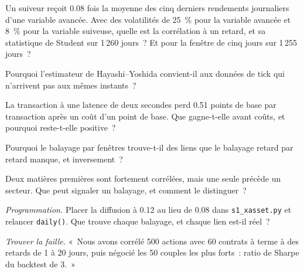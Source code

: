 \begin{exercise}[$\star$]\label{exo:s1:cross-asset-lead-lag:2}
Un suiveur reçoit 0.08 fois la moyenne des cinq derniers rendements journaliers d'une variable avancée. Avec des volatilités de 25~\% pour la variable avancée et 8~\% pour la variable suiveuse, quelle
est la corrélation à un retard, et sa statistique de Student sur 1\,260 jours~? Et pour la fenêtre de cinq jours sur 1\,255 jours~?
\end{exercise}

\begin{exercise}[$\star$]\label{exo:s1:cross-asset-lead-lag:3}
Pourquoi l'estimateur de Hayashi--Yoshida convient-il aux données de tick qui n'arrivent pas aux mêmes instants~?
\end{exercise}

\begin{exercise}[$\star\star$]\label{exo:s1:cross-asset-lead-lag:4}
La transaction à une latence de deux secondes perd 0.51 points de base par transaction après un coût d'un point de base. Que gagne-t-elle avant coûts, et pourquoi
reste-t-elle positive~?
\end{exercise}

\begin{exercise}[$\star\star$]\label{exo:s1:cross-asset-lead-lag:5}
Pourquoi le balayage par fenêtres trouve-t-il des liens que le balayage retard par retard manque, et inversement~?
\end{exercise}

\begin{exercise}[$\star\star$]\label{exo:s1:cross-asset-lead-lag:6}
Deux matières premières sont fortement corrélées, mais une seule précède un secteur. Que peut signaler un balayage, et comment le distinguer~?
\end{exercise}

\begin{exercise}[$\star\star\star$]\label{exo:s1:cross-asset-lead-lag:7}
\emph{Programmation.} Placer la diffusion à 0.12 au lieu de 0.08 dans \texttt{s1\_xasset.py} et relancer \texttt{daily()}. Que trouve chaque balayage, et
chaque lien est-il réel~?
\end{exercise}

\begin{exercise}[$\star\star\star$]\label{exo:s1:cross-asset-lead-lag:8}
\emph{Trouver la faille.} «~Nous avons corrélé 500 actions avec 60 contrats à terme à des retards de 1 à 20 jours, puis négocié les 50 couples les plus forts~: ratio de Sharpe du backtest de 3.~»
\end{exercise}

